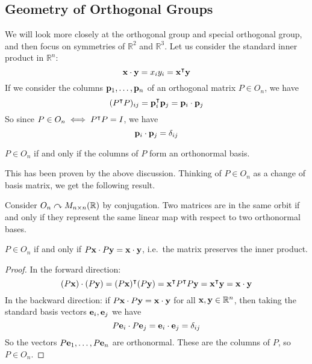 \subsection{Geometry of Orthogonal Groups}
We will look more closely at the orthogonal group and special orthogonal group, and then focus on symmetries of \(\mathbb R^2\) and \(\mathbb R^3\).
Let us consider the standard inner product in \(\mathbb R^n\):
\[
	\vb x \cdot \vb y = x_i y_i = \vb x^\intercal \vb y
\]
If we consider the columns \(\vb p_1, \dots, \vb p_n\) of an orthogonal matrix \(P \in O_n\), we have
\[
	(P^\intercal P)_{ij} = \vb p_i^\intercal \vb p_j = \vb p_i \cdot \vb p_j
\]
So since \(P \in O_n \iff P^\intercal P = I\), we have
\[
	\vb p_i \cdot \vb p_j = \delta_{ij}
\]
\begin{proposition}
	\(P \in O_n\) if and only if the columns of \(P\) form an orthonormal basis.
\end{proposition}
This has been proven by the above discussion.
Thinking of \(P \in O_n\) as a change of basis matrix, we get the following result.
\begin{proposition}
	Consider \(O_n \curvearrowright M_{n \times n}(\mathbb R)\) by conjugation.
	Two matrices are in the same orbit if and only if they represent the same linear map with respect to two orthonormal bases.
\end{proposition}
\begin{proposition}
	\(P \in O_n\) if and only if \(P \vb x \cdot P \vb y = \vb x \cdot \vb y\), i.e.\ the matrix preserves the inner product.
\end{proposition}
\begin{proof}
	In the forward direction:
	\[
		(P\vb x) \cdot (P \vb y) = (P \vb x)^\intercal (P \vb y) = \vb x^\intercal P^\intercal P \vb y = \vb x^\intercal \vb y = \vb x \cdot \vb y
	\]
	In the backward direction: if \(P\vb x \cdot P\vb y = \vb x \cdot \vb y\) for all \(\vb x, \vb y \in \mathbb R^n\), then taking the standard basis vectors \(\vb e_i, \vb e_j\) we have
	\[
		P\vb e_i \cdot P\vb e_j = \vb e_i \cdot \vb e_j = \delta_{ij}
	\]
	So the vectors \(P\vb e_1, \dots, P\vb e_n\) are orthonormal.
	These are the columns of \(P\), so \(P \in O_n\).
\end{proof}
